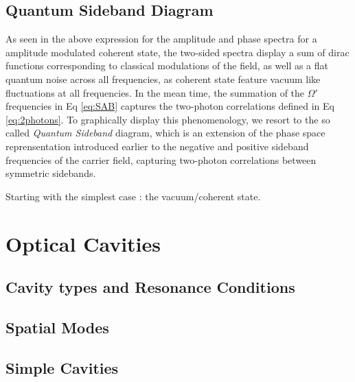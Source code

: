 \subsection{Quantum Sideband Diagram }
As seen in the above expression for the amplitude and phase spectra for a amplitude modulated coherent state, the two-sided spectra display a sum of dirac functions corresponding to classical modulations of the field, as well as a flat quantum noise across all frequencies, as coherent state feature vacuum like fluctuations at all frequencies. In the mean time, the summation of the $\Omega'$ frequencies in Eq \eqref{eq:SAB} captures the two-photon correlations defined in Eq \eqref{eq:2photons}. To graphically display this phenomenology, we resort to the so called \textit{Quantum Sideband} diagram, which is an extension of the phase space reprensentation introduced earlier to the negative and positive sideband frequencies of the carrier field, capturing two-photon correlations between symmetric sidebands.  

Starting with the simplest case : the vacuum/coherent state. 
\section{Optical Cavities}
\subsection{Cavity types and Resonance Conditions}
\subsection{Spatial Modes}
\subsection{\textrm{Simple} Cavities}

